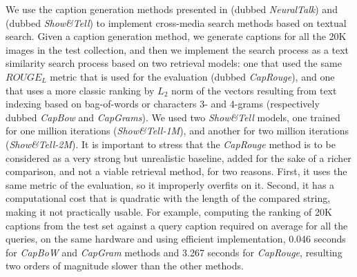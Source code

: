 We use the caption generation methods presented in \cite{karpathy2015deep} (dubbed \emph{NeuralTalk}) and \cite{vinyals2015show} (dubbed \emph{Show\&Tell}) to implement cross-media search methods based on textual search.
Given a caption generation method, we generate captions for all the 20K images in the test collection, and then we implement the search process as a text similarity search process based on two retrieval models: one that used the same $ROUGE_L$ metric that is used for the evaluation (dubbed \emph{CapRouge}), and one that uses a more classic ranking by $L_2$ norm of the vectors resulting from text indexing based on bag-of-words or characters 3- and 4-grams (respectively dubbed \emph{CapBow} and \emph{CapGrams}).
We used two \emph{Show\&Tell} models, one trained for one million iterations (\emph{Show\&Tell-1M}), and another for two million iterations (\emph{Show\&Tell-2M}).
It is important to stress that the \emph{CapRouge} method is to be considered as a very strong but unrealistic baseline, added for the sake of a richer comparison, and not a viable retrieval method, for two reasons.
First, it uses the same metric of the evaluation, so it improperly overfits on it.
Second, it has a computational cost that is quadratic with the length of the compared string, making it not practically usable.
For example, computing the ranking of 20K captions from the test set against a query caption required on average for all the queries, on the same hardware and using efficient implementation, 0.046 seconds for \emph{CapBoW} and \emph{CapGram} methods and 3.267 seconds for \emph{CapRouge}, resulting two orders of magnitude slower than the other methods.

